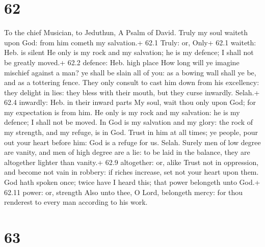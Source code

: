 \hypertarget{section-61}{%
\section{62}\label{section-61}}

To the chief Musician, to Jeduthun, A Psalm of David.  Truly
my soul waiteth upon God: from him cometh my salvation.+ 62.1 Truly: or,
Only+ 62.1 waiteth: Heb. is silent  He only is my rock and
my salvation; he is my defence; I shall not be greatly moved.+ 62.2
defence: Heb. high place  How long will ye imagine mischief
against a man? ye shall be slain all of you: as a bowing wall shall ye
be, and as a tottering fence.  They only consult to cast him
down from his excellency: they delight in lies: they bless with their
mouth, but they curse inwardly. Selah.+ 62.4 inwardly: Heb. in their
inward parts  My soul, wait thou only upon God; for my
expectation is from him.  He only is my rock and my
salvation: he is my defence; I shall not be moved.  In God
is my salvation and my glory: the rock of my strength, and my refuge, is
in God.  Trust in him at all times; ye people, pour out your
heart before him: God is a refuge for us. Selah.  Surely men
of low degree are vanity, and men of high degree are a lie: to be laid
in the balance, they are altogether lighter than vanity.+ 62.9
altogether: or, alike  Trust not in oppression, and become
not vain in robbery: if riches increase, set not your heart upon them.
 God hath spoken once; twice have I heard this; that power
belongeth unto God.+ 62.11 power: or, strength  Also unto
thee, O Lord, belongeth mercy: for thou renderest to every man according
to his work.

\hypertarget{section-62}{%
\section{63}\label{section-62}}

